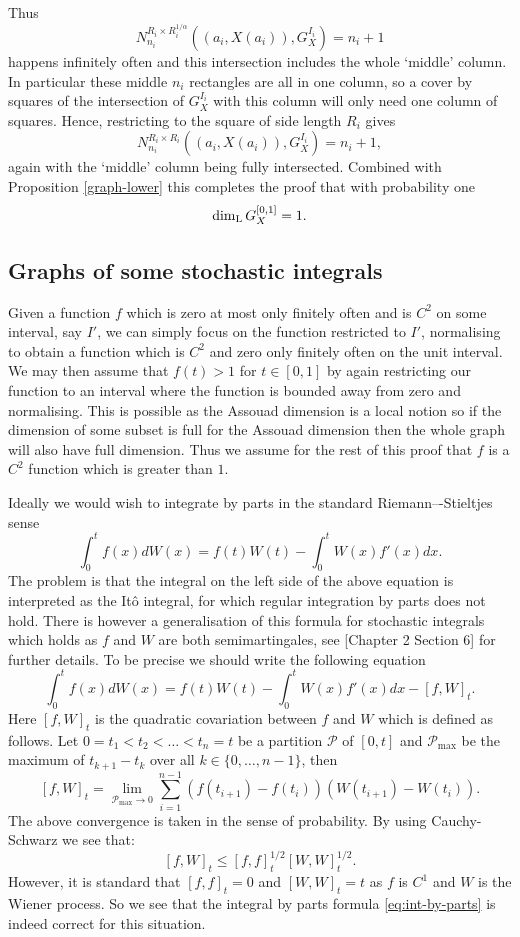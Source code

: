 Thus 
\[
N_{n_i}^{R_i \times R_i^{1/\alpha}}\left((a_i,X(a_i)), G_X^{I_i}\right) = n_i + 1
\]
happens infinitely often and this intersection includes the whole `middle' column. In particular these middle $n_i$ rectangles are all in one column, so a cover by squares of the intersection of $G_X^{I_i}$ with this column will only need one column of squares. Hence, restricting to the square of side length $R_i$ gives
\[
N_{n_i}^{R_i \times R_i}\left((a_i,X(a_i)), G_X^{I_i}\right) = n_i + 1,
\]
again with the `middle' column being fully intersected. Combined with Proposition \ref{graph-lower} this completes the proof that with probability one 
\[
\dim_{\textup{L}} G_X^{[0,1]} = 1.
\]



\subsection{Graphs of some stochastic integrals}


	Given a function $f$ which is zero at most only finitely often and is $C^2$ on some interval, say $I'$, we can simply focus on the function restricted to $I'$, normalising to obtain a function which is $C^2$ and zero only finitely often on the unit interval. We may then assume that $f(t)>1$ for $t\in [0,1]$ by again restricting our function to an interval where the function is bounded away from zero and normalising. This is possible as the Assouad dimension is a local notion so if the dimension of some subset is full for the Assouad dimension then the whole graph will also have full dimension. Thus we assume for the rest of this proof that $f$ is a $C^2$ function which is greater than $1$.
	
	Ideally we would wish to integrate by parts in the standard Riemann–-Stieltjes sense
	\begin{equation}
	    \int_{0}^{t}f(x)dW(x)=f(t)W(t)-\int_{0}^{t}W(x)f'(x)dx.\label{eq:int-by-parts}
	\end{equation}
	The problem is that the integral on the left side of the above equation is interpreted as the It\^{o} integral, for which regular integration by parts does not hold. There is however a generalisation of this formula for stochastic integrals which holds as $f$ and $W$ are both semimartingales, see \cite{protter}[Chapter 2 Section 6] for further details. To be precise we should write the following equation
	\[
	\int_{0}^{t}f(x)dW(x)=f(t)W(t)-\int_{0}^{t}W(x)f'(x)dx-[f,W]_t.
	\]
	Here $[f,W]_t$ is the quadratic covariation between $f$ and $W$ which is defined as follows. Let $0=t_1<t_2<\dots<t_n=t$ be a partition $\mathcal{P}$ of $[0,t]$ and $\mathcal{P}_{\max}$ be the maximum of $t_{k+1}-t_k$ over all $k\in\{0,\dots,n-1\}$, then
	\[
	[f,W]_t=\lim_{\mathcal{P}_{\max}\rightarrow 0} \sum_{i=1}^{n-1} (f(t_{i+1})-f(t_{i}))(W(t_{i+1})-W(t_i)).
	\]
	The above convergence is taken in the sense of probability. By using Cauchy-Schwarz we see that:
	\[
	[f,W]_t\leq [f,f]^{1/2}_t[W,W]^{1/2}_t.
	\]
	However, it is standard that $[f,f]_t=0$ and $[W,W]_t=t$ as $f$ is $C^1$ and $W$ is the Wiener process. So we see that the integral by parts formula \eqref{eq:int-by-parts} is indeed correct for this situation. 
	
